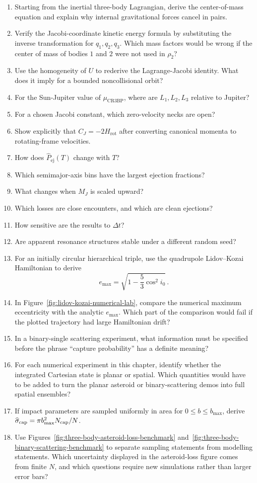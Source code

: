 \begin{enumerate}
\item Starting from the inertial three-body Lagrangian, derive the
center-of-mass equation and explain why internal gravitational forces cancel in
pairs.
\item Verify the Jacobi-coordinate kinetic energy formula by substituting the
inverse transformation for \(q_1,q_2,q_3\). Which mass factors would be wrong
if the center of mass of bodies \(1\) and \(2\) were not used in \(\rho_2\)?
\item Use the homogeneity of \(U\) to rederive the Lagrange-Jacobi identity.
What does it imply for a bounded noncollisional orbit?
\item For the Sun-Jupiter value of \(\mu_{\mathrm{CR3BP}}\), where are
\(L_1,L_2,L_3\) relative to Jupiter?
\item For a chosen Jacobi constant, which zero-velocity necks are open?
\item Show explicitly that \(C_J=-2H_{\mathrm{rot}}\) after converting
canonical momenta to rotating-frame velocities.
\item How does \(\widehat P_{\mathrm{ej}}(T)\) change with \(T\)?
\item Which semimajor-axis bins have the largest ejection fractions?
\item What changes when \(M_J\) is scaled upward?
\item Which losses are close encounters, and which are clean ejections?
\item How sensitive are the results to \(\Delta t\)?
\item Are apparent resonance structures stable under a different random seed?
\item For an initially circular hierarchical triple, use the quadrupole
Lidov--Kozai Hamiltonian to derive
\[
  e_{\max}=\sqrt{1-\frac53\cos^2 i_0}\, .
\]
\item In Figure~\ref{fig:lidov-kozai-numerical-lab}, compare the numerical
maximum eccentricity with the analytic \(e_{\max}\).  Which part of the
comparison would fail if the plotted trajectory had large Hamiltonian drift?
\item In a binary-single scattering experiment, what information must be
specified before the phrase ``capture probability'' has a definite meaning?
\item For each numerical experiment in this chapter, identify whether the
integrated Cartesian state is planar or spatial.  Which quantities would have
to be added to turn the planar asteroid or binary-scattering demos into full
spatial ensembles?
\item If impact parameters are sampled uniformly in area for
\(0\le b\le b_{\max}\), derive
\(\widehat\sigma_{\rm cap}=\pi b_{\max}^2N_{\rm cap}/N\).
\item Use Figures~\ref{fig:three-body-asteroid-loss-benchmark}
and~\ref{fig:three-body-binary-scattering-benchmark} to separate sampling
statements from modelling statements.  Which uncertainty displayed in the
asteroid-loss figure comes from finite \(N\), and which questions require new
simulations rather than larger error bars?
\end{enumerate}

